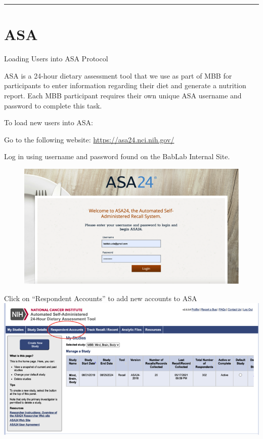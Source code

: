 \documentclass[]{book}
\begin{document}
\begin{center}\rule{0.5\linewidth}{0.5pt}\end{center}

\hypertarget{asa}{%
\section{ASA}\label{asa}}

Loading Users into ASA Protocol

ASA is a 24-hour dietary assessment tool that we use as part of MBB for participants to enter information regarding their diet and generate a nutrition report. Each MBB participant requires their own unique ASA username and password to complete this task.

To load new users into ASA:

Go to the following website: \url{https://asa24.nci.nih.gov/}

Log in using username and password found on the BabLab Internal Site.

\begin{figure}
\centering
\includegraphics{images/research_protocols/asa/asa_1.png}
\caption{}
\end{figure}

Click on ``Respondent Accounts'' to add new accounts to ASA
\includegraphics{images/research_protocols/asa/asa_2.png}
\end{document}

